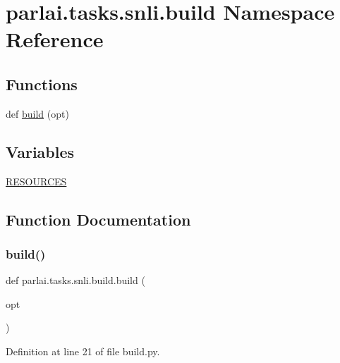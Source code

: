 \hypertarget{namespaceparlai_1_1tasks_1_1snli_1_1build}{}\section{parlai.\+tasks.\+snli.\+build Namespace Reference}
\label{namespaceparlai_1_1tasks_1_1snli_1_1build}
\subsection*{Functions}
\begin{DoxyCompactItemize}
\item 
def \hyperlink{namespaceparlai_1_1tasks_1_1snli_1_1build_a525584627ce716e22d77dd663be2c2ba}{build} (opt)
\end{DoxyCompactItemize}
\subsection*{Variables}
\begin{DoxyCompactItemize}
\item 
\hyperlink{namespaceparlai_1_1tasks_1_1snli_1_1build_ae6b4372d4e627c59cb67c273f5dabca7}{R\+E\+S\+O\+U\+R\+C\+ES}
\end{DoxyCompactItemize}


\subsection{Function Documentation}
\mbox{\label{namespaceparlai_1_1tasks_1_1snli_1_1build_a525584627ce716e22d77dd663be2c2ba}} 
\subsubsection{\texorpdfstring{build()}{build()}}
{\footnotesize\ttfamily def parlai.\+tasks.\+snli.\+build.\+build (\begin{DoxyParamCaption}\item[{}]{opt }\end{DoxyParamCaption})}



Definition at line 21 of file build.\+py.


